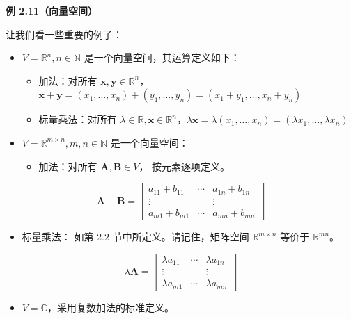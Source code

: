 \begin{notebox}
\textbf{例 2.11（向量空间）}
\end{notebox}

\begin{notebox}
让我们看一些重要的例子：

\begin{itemize}
\item $ V = \mathbb{R}^n, n \in \mathbb{N} $ 是一个向量空间，其运算定义如下：
\begin{itemize}
\item 加法：对所有 $ \boldsymbol{x}, \boldsymbol{y} \in \mathbb{R}^n $，$ \boldsymbol{x} + \boldsymbol{y} = (x_1, \ldots, x_n) + (y_1, \ldots, y_n) = (x_1 + y_1, \ldots, x_n + y_n) $
\item 标量乘法：对所有 $ \lambda \in \mathbb{R}, \boldsymbol{x} \in \mathbb{R}^n $，$ \lambda \boldsymbol{x} = \lambda (x_1, \ldots, x_n) = (\lambda x_1, \ldots, \lambda x_n) $
\end{itemize}
\item $ V = \mathbb{R}^{m \times n}, m, n \in \mathbb{N} $ 是一个向量空间：
\begin{itemize}
\item 加法：对所有 $ \boldsymbol{A}, \boldsymbol{B} \in V $， 按元素逐项定义。
\end{itemize}
\end{itemize}
\begin{equation*}
\boldsymbol{A} + \boldsymbol{B} = \begin{bmatrix} a_{11} + b_{11} & \cdots & a_{1n} + b_{1n} \\ \vdots & & \vdots \\ a_{m1} + b_{m1} & \cdots & a_{mn} + b_{mn} \end{bmatrix}
\end{equation*}
\begin{itemize}
\begin{itemize}
\item 标量乘法： 如第 2.2 节中所定义。请记住，矩阵空间 $ \mathbb{R}^{m \times n} $ 等价于 $ \mathbb{R}^{mn} $。
\end{itemize}
\end{itemize}
\begin{equation*}
\lambda \boldsymbol{A} = \begin{bmatrix} \lambda a_{11} & \cdots & \lambda a_{1n} \\ \vdots & & \vdots \\ \lambda a_{m1} & \cdots & \lambda a_{mn} \end{bmatrix}
\end{equation*}
\begin{itemize}
\item $ V = \mathbb{C} $，采用复数加法的标准定义。
\end{itemize}
\end{notebox}

